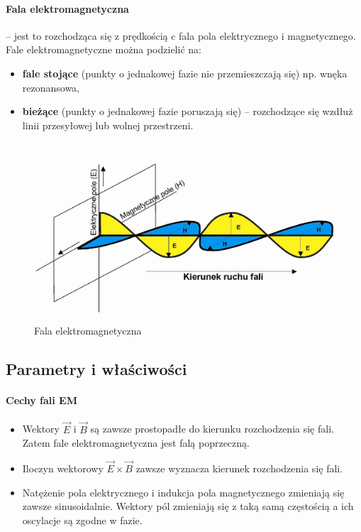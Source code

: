 \documentclass[a4paper,twoside]{report}
\begin{document}
\paragraph{Fala elektromagnetyczna} – jest to rozchodząca się z prędkością c fala pola elektrycznego i magnetycznego. Fale elektromagnetyczne można podzielić na:
\begin{itemize}
\item \textbf{fale stojące} (punkty o jednakowej fazie nie przemieszczają się) np. wnęka rezonansowa,
\item \textbf{bieżące} (punkty o jednakowej fazie poruszają się) – rozchodzące się wzdłuż linii przesyłowej lub wolnej przestrzeni.
\end{itemize}

\begin{figure}[htbp]
\centering
\includegraphics[scale=0.25]{obrazy/fala.jpg}
\caption{Fala elektromagnetyczna}
\label{rys:fala_wektory}
\end{figure}

\subsection{Parametry i właściwości}
\paragraph{Cechy fali EM}
\begin{itemize}
\item Wektory $\overrightarrow{E}$ i $\overrightarrow{B}$ są zawsze prostopadłe do kierunku rozchodzenia się fali. Zatem fale elektromagnetyczna jest falą poprzeczną.
\item Iloczyn wektorowy $\overrightarrow{E} \times \overrightarrow{B}$ zawsze wyznacza kierunek rozchodzenia się fali.
\item Natężenie pola elektrycznego i indukcja pola magnetycznego zmieniają się zawsze sinusoidalnie. Wektory pól zmieniają się z taką samą częstością a ich oscylacje są zgodne w fazie.
\end{itemize}
\end{document}

